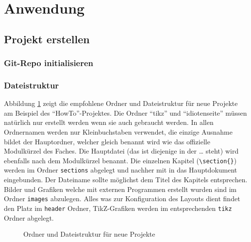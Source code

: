 \section{Anwendung}
\subsection{Projekt erstellen}
\subsubsection{Git-Repo initialisieren}

\subsubsection{Dateistruktur}
Abbildung \ref{fig:OrdnerDatei} zeigt die empfohlene Ordner und Dateistruktur für neue Projekte am Beispiel des "`HowTo"'-Projektes.
Die Ordner "`tikz"' und "`idiotenseite"' müssen natürlich nur erstellt werden wenn sie auch gebraucht werden. In allen Ordnernamen werden nur
Kleinbuchstaben verwendet, die einzige Ausnahme bildet der Hauptordner, welcher gleich benannt wird wie das offizielle Modulkürzel des Faches.
Die Hauptdatei (das ist diejenige in der \verb++ \ldots \verb++ steht) wird ebenfalls nach dem Modulkürzel benannt.
Die einzelnen Kapitel (\verb+\section{}+) werden im Ordner \verb+sections+ abgelegt und nachher mit \verb++ in das Hauptdokument eingebunden.
Der Dateiname sollte möglichst dem Titel des Kapitels entsprechen. Bilder und Grafiken welche mit externen Programmen erstellt wurden sind im Ordner
\verb+images+ abzulegen. Alles was zur Konfiguration des Layouts dient findet den Platz im \verb+header+ Ordner, TikZ-Grafiken werden im entsprechenden
\verb+tikz+ Ordner abgelegt.

\begin{figure}[h]
\begin{center}
  \caption[Ordner und Dateistruktur]{Ordner und Dateistruktur für neue Projekte}
  \label{fig:OrdnerDatei}
\end{center}
\end{figure}

